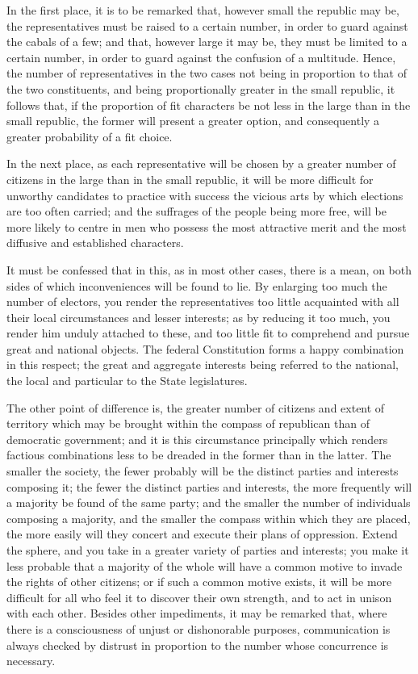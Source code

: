 In the first place, it is to be remarked that, however small the republic may be, the representatives must be raised to a certain number, in order to guard against the cabals of a few; and that, however large it may be, they must be limited to a certain number, in order to guard against the confusion of a multitude. Hence, the number of representatives in the two cases not being in proportion to that of the two constituents, and being proportionally greater in the small republic, it follows that, if the proportion of fit characters be not less in the large than in the small republic, the former will present a greater option, and consequently a greater probability of a fit choice.

In the next place, as each representative will be chosen by a greater number of citizens in the large than in the small republic, it will be more difficult for unworthy candidates to practice with success the vicious arts by which elections are too often carried; and the suffrages of the people being more free, will be more likely to centre in men who possess the most attractive merit and the most diffusive and established characters.

It must be confessed that in this, as in most other cases, there is a mean, on both sides of which inconveniences will be found to lie. By enlarging too much the number of electors, you render the representatives too little acquainted with all their local circumstances and lesser interests; as by reducing it too much, you render him unduly attached to these, and too little fit to comprehend and pursue great and national objects. The federal Constitution forms a happy combination in this respect; the great and aggregate interests being referred to the national, the local and particular to the State legislatures.

The other point of difference is, the greater number of citizens and extent of territory which may be brought within the compass of republican than of democratic government; and it is this circumstance principally which renders factious combinations less to be dreaded in the former than in the latter. The smaller the society, the fewer probably will be the distinct parties and interests composing it; the fewer the distinct parties and interests, the more frequently will a majority be found of the same party; and the smaller the number of individuals composing a majority, and the smaller the compass within which they are placed, the more easily will they concert and execute their plans of oppression. Extend the sphere, and you take in a greater variety of parties and interests; you make it less probable that a majority of the whole will have a common motive to invade the rights of other citizens; or if such a common motive exists, it will be more difficult for all who feel it to discover their own strength, and to act in unison with each other. Besides other impediments, it may be remarked that, where there is a consciousness of unjust or dishonorable purposes, communication is always checked by distrust in proportion to the number whose concurrence is necessary.

